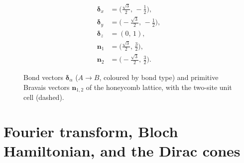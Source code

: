 \documentclass[
  aps,
  prl,
  preprint,
  amsmath,
  amssymb,
  superscriptaddress,
  floatfix
]{revtex4-2}
\begin{document}
\begin{figure}[H]
\begin{minipage}[c]{0.34\textwidth}
\begin{tikzpicture}[scale=1.15, line width=0.6pt]
  \end{tikzpicture}
  \end{minipage}\hspace{2em}
  \begin{minipage}[c]{0.34\textwidth}
  \[
  \begin{aligned}
    \bm\delta_x &= \big(\tfrac{\sqrt3}{2},\, -\tfrac12\big),\\[2pt]
    \bm\delta_y &= \big(-\tfrac{\sqrt3}{2},\, -\tfrac12\big),\\[2pt]
    \bm\delta_z &= (0,\, 1),\\[5pt]
    \bm n_1 &= \big(\tfrac{\sqrt3}{2},\, \tfrac32\big),\\[2pt]
    \bm n_2 &= \big(-\tfrac{\sqrt3}{2},\, \tfrac32\big).
  \end{aligned}
  \]
  \end{minipage}
  \caption{Bond vectors $\bm\delta_\alpha$ ($A\to B$, coloured by bond
    type) and primitive Bravais vectors $\bm n_{1,2}$ of the honeycomb
    lattice, with the two-site unit cell (dashed).}
  \label{fig:sm_conventions}
\end{figure}

\section{Fourier transform, Bloch Hamiltonian, and the Dirac cones}
\label{sm:fourier}
\end{document}
